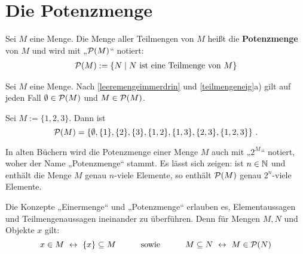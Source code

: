 \section{Die Potenzmenge}


\begin{defin}[Potenzmenge] \label{def:potenzmenge} 
    Sei $M$ eine Menge. Die Menge aller Teilmengen von $M$ heißt die \textbf{Potenzmenge} von $M$ und wird mit „$\mathcal P(M)$“ notiert:
    \begin{align*}
        \mathcal P(M) := \{N \mid N \ \text{ist eine Teilmenge von $M$} \}
    \end{align*}
\end{defin}


\begin{bem}
    Sei $M$ eine Menge. Nach \cref{leeremengeimmerdrin} und \cref{teilmengeneig}a) gilt auf jeden Fall $\emptyset\in \mathcal P(M)$ und $M\in \mathcal P(M)$.
\end{bem}


\begin{bsp} \label{bsp:potenzmenge}
    Sei $M:=\{1,2,3\}$. Dann ist
        \[ \mathcal P(M)=\left\{\emptyset,\{1\},\{2\},\{3\},\{1,2\},\{1,3\},\{2,3\},\{1,2,3\}\right\}\,. \]
\end{bsp}


\noindent In alten Büchern wird die Potenzmenge einer Menge $M$ auch mit „$2^M$“ notiert, woher der Name „Potenzmenge“ stammt. Es lässt sich zeigen: ist $n\in \mathbb N$ und enthält die Menge $M$ genau $n$-viele Elemente, so enthält $\mathcal P(M)$ genau $2^n$-viele Elemente.


\begin{bem}
    Die Konzepte „Einermenge“ und „Potenzmenge“ erlauben es, Elementaussagen und Teilmengenaussagen ineinander zu überführen. Denn für Mengen $M,N$ und Objekte $x$ gilt:
        \[ x\in M\ \leftrightarrow\ \{x\}\subseteq M \quad\qquad\text{sowie}\quad\qquad M\subseteq N\  \leftrightarrow\ M\in \calP(N) \]
\end{bem}


